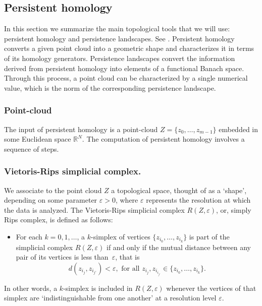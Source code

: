 \documentclass[11pt]{amsart}
\theoremstyle{definition}
\theoremstyle{remark}
\numberwithin{equation}{section}
\newcommand{\eps}{\varepsilon}
\def\R{\mathbb{R}}
\begin{document}

\subsection{Persistent homology}
\label{sec:persistent}
In this section we summarize the main topological tools that we will use: persistent homology and persistence landscapes.
See \cite{edelsbrunner2022computational,bubenik2015statistical,bubenik2017persistence}.
Persistent homology converts a given point cloud into a geometric shape and characterizes it in terms of its homology generators.
Persistence landscapes convert the information derived from persistent homology into elements of a functional Banach space.
Through this process, a point cloud can be characterized by a single numerical value, which is the norm of the corresponding persistence landscape.

\subsubsection{Point-cloud} The input of persistent homology is a  point-cloud   $Z = \{z_0, \ldots ,z_{m-1}\}$ embedded in some Euclidean space $\R^N$.
The computation of persistent homology involves a sequence of steps.


\subsubsection{Vietoris-Rips simplicial complex.} We associate to the point cloud $Z$ a topological space, thought of as a `shape', depending on some parameter $\eps>0$,  where
$\eps$ represents the resolution at which the data is analyzed.
The Vietoris-Rips simplicial complex $R(Z, \eps)$, or, simply Rips complex, is defined  as follows:
\begin{itemize}
\item For each $k= 0,1, \ldots$, a $k$-simplex of vertices $\{z_{i_0},\ldots, z_{i_{k}}\}$ is part of the simplicial complex $R(Z,\eps)$ if and only if the mutual
distance between  any pair of its   vertices is less than~$\eps$, that is
\[d(z_{i_j},z_{i_{j'}})<\eps, \textrm { for all } z_{i_j},z_{i_{i_{j'}}}\in
\{z_{i_0},\ldots, z_{i_{k}}\}. \]
\end{itemize}
In other words, a $k$-simplex is included in $R(Z,\eps)$   whenever the vertices of that simplex are `indistinguishable from one
another' at  a  resolution   level $\eps$.
\end{document}
